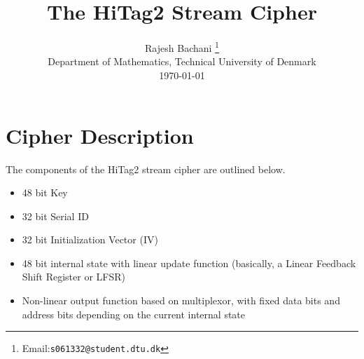 \documentclass[11pt,a4paper]{article}
\begin{document}
	

%
%
%
%
\newcommand{\TITLE}{The HiTag2 Stream Cipher}
%
\oddsidemargin 0.0in \evensidemargin 1.0in \textwidth 6.0in
%
\begin{titlepage}
\title{\TITLE}
%
\author{Rajesh Bachani \thanks{Email:{\texttt{s061332@student.dtu.dk}}}\\
%
\small Department of Mathematics, Technical University of Denmark\\
\small \today}
\date{}
\end{titlepage}

\maketitle

\section{Cipher Description}
The components of the HiTag2 stream cipher are outlined below. 
\begin{itemize}
\item 48 bit Key
\item 32 bit Serial ID
\item 32 bit Initialization Vector (IV)
\item 48 bit internal state with linear update function (basically, a Linear Feedback Shift Register or LFSR)
\item Non-linear output function based on multiplexor, with fixed data bits and address bits depending on the current internal state
\end{itemize}
\end{document}
